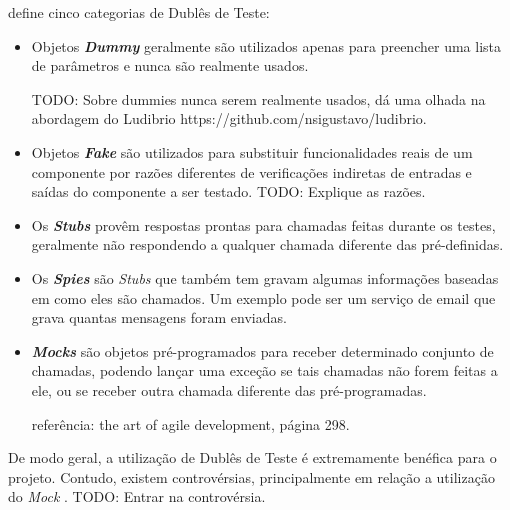  define cinco categorias de Dublês de Teste:

\begin{itemize}
\item
Objetos \textbf{\textit{Dummy}} geralmente são utilizados apenas para preencher uma lista de parâmetros e nunca são realmente usados.

TODO: Sobre dummies nunca serem realmente usados, dá uma olhada na abordagem do Ludibrio https://github.com/nsigustavo/ludibrio.

\item
Objetos \textbf{\textit{Fake}} são utilizados para substituir funcionalidades reais de um componente por razões diferentes de verificações indiretas de entradas e saídas do componente a ser testado. TODO: Explique as razões.

\item
Os \textbf{\textit{Stubs}} provêm respostas prontas para chamadas feitas durante os testes, geralmente não respondendo a qualquer   chamada diferente
das pré-definidas.

\item
Os \textbf{\textit{Spies}} são \textit{Stubs} que também tem gravam algumas informações baseadas em como eles são chamados. Um exemplo   pode ser um serviço de email que grava quantas mensagens foram   enviadas.

\item
\textbf{\textit{Mocks}} são objetos pré-programados para receber determinado conjunto de chamadas, podendo lançar uma exceção se tais chamadas não forem feitas a ele, ou se receber outra chamada diferente das pré-programadas.

referência: the art of agile development, página 298.
\end{itemize}

De modo geral, a utilização de Dublês de Teste é extremamente benéfica para o projeto. Contudo, existem controvérsias, principalmente em relação a utilização do \textit{Mock} \cite{MocksArentStubs}. TODO: Entrar na controvérsia.

